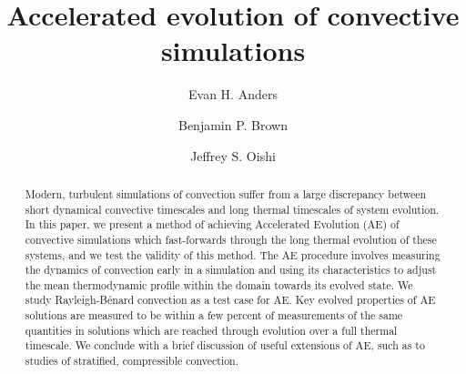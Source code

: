 \documentclass[aps, pre, onecolumn, nofootinbib, notitlepage, groupedaddress, amsfonts, amssymb, amsmath, longbibliography]{revtex4-1}
\newcommand{\RB}{Rayleigh-B\'{e}nard }
\begin{document}
\author{Evan H. Anders}
\author{Benjamin P. Brown}
\author{Jeffrey S. Oishi}
\title{Accelerated evolution of convective simulations}

\begin{abstract}
Modern, turbulent simulations of convection suffer from a large discrepancy between
short dynamical convective timescales and long thermal timescales of system evolution.
In this paper, we present a method of achieving Accelerated Evolution (AE) of convective simulations which
fast-forwards through the long thermal evolution of these systems, and we test the
validity of this method. The AE procedure involves measuring the dynamics of convection
early in a simulation and using its characteristics to adjust the mean thermodynamic
profile within the domain towards its evolved state. We study \RB convection as a test case for AE.  
Key evolved properties of AE solutions are measured to be within a few percent
of measurements of the same quantities in solutions which are reached through 
evolution over a full thermal timescale. We conclude with a brief discussion of useful extensions
of AE, such as to studies of stratified, compressible convection.
\end{abstract}
\maketitle

\end{document}
